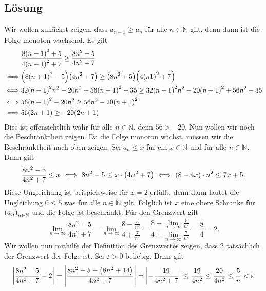 \documentclass[german,12pt]{homework}
\newcommand{\NN}{\mathbb{N}}
\DeclarePairedDelimiter{\absolute}{\lvert}{\rvert}
\DeclarePairedDelimiter{\enbrace}{(}{)}
\begin{document}
    \subsection*{Lösung} Wir wollen zunächst zeigen, dass \(a_{n + 1} \ge a_n\)
    für alle \(n \in \NN\) gilt, denn dann ist die Folge monoton wachsend. Es
    gilt
    \begin{align*}
        &\frac{8\enbrace*{n + 1}^2 + 5}{4\enbrace*{n + 1}^2 + 7} \ge \frac{8n^2
        + 5}{4n^2 + 7}\\ \iff &\enbrace*{8\enbrace*{n + 1}^2 - 5}\enbrace*{4n^2
        + 7} \ge \enbrace*{8n^2 + 5}\enbrace*{4\enbrace*{n  1}^2 + 7}\\
        \iff &32\enbrace*{n + 1}^2n^2 - 20n^2 + 56\enbrace*{n + 1}^2 - 35 \ge
        32\enbrace*{n + 1}^2n^2 - 20\enbrace*{n + 1}^2 + 56n^2 - 35\\
        \iff &56\enbrace*{n + 1}^2 - 20n^2 \ge 56n^2 - 20\enbrace*{n + 1}^2\\
        \iff &56\enbrace*{2n + 1} \ge -20\enbrace*{2n + 1}
    \end{align*}
    Dies ist offensichtlich wahr für alle \(n \in \NN\), denn \(56 > -20\). Nun
    wollen wir noch die Beschränktheit zeigen. Da die Folge monoton wächst,
    müssen wir die Beschränktheit nach oben zeigen. Sei \(a_n \le x\) für ein
    \(x \in \NN\) und für alle \(n \in \NN\). Dann gilt
    \[\frac{8n^2 - 5}{4n^2 + 7} \le x \iff 8n^2 - 5 \le x \cdot \enbrace*{4n^2
    + 7} \iff \enbrace*{8 - 4x} \cdot n^2 \le 7x + 5.\]
    Diese Ungleichung ist beispielsweise für \(x = 2\) erfüllt, denn dann
    lautet die Ungleichung \(0 \le 5\) was für alle \(n \in \NN\) gilt.
    Folglich ist \(x\) eine obere Schranke für \(\enbrace*{a_n}_{n \in \NN}\)
    und die Folge ist beschränkt. Für den Grenzwert gilt
    \[\lim_{n \to \infty}\frac{8n^2 - 5}{4n^2 + 7} = \lim_{n \to \infty}\frac{8
    - \frac{5}{n^2}}{4 + \frac{7}{n^2}} = \frac{8 - \lim_{n \to
    \infty}\frac{5}{n^2}}{4 + \lim_{n \to \infty}\frac{7}{n^2}} = \frac{8}{4} =
    2.\]
    Wir wollen nun mithilfe der Definition des Grenzwertes zeigen, dass \(2\)
    tatsächlich der Grenzwert der Folge ist. Sei \(\varepsilon > 0\) beliebig.
    Dann gilt
    \begin{align*}
        \absolute*{\frac{8n^2 - 5}{4n^2 + 7} - 2} = \absolute*{\frac{8n^2 - 5 -
        \enbrace*{8n^2 + 14}}{4n^2 + 7}} = \absolute*{-\frac{19}{4n^2 + 7}} \le
        \frac{19}{4n^2} \le \frac{20}{4n^2} \le \frac{5}{n} < \varepsilon
    \end{align*}
\end{document}
